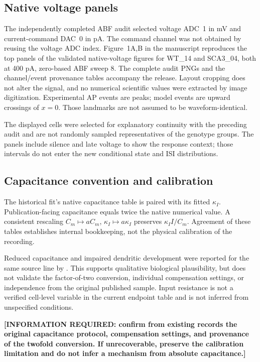 \documentclass[11pt,a4paper]{article}
\newcommand{\required}[1]{\textbf{[INFORMATION REQUIRED: #1]}}
\begin{document}
\subsection*{Native voltage panels}
The independently completed ABF audit selected voltage ADC~1 in mV and current-command DAC~0 in pA. The command channel was not obtained by reusing the voltage ADC index. Figure~1A,B in the manuscript reproduces the top panels of the validated native-voltage figures for WT\_14 and SCA3\_04, both at 400 pA, zero-based ABF sweep 8. The complete audit PNGs and the channel/event provenance tables accompany the release. Layout cropping does not alter the signal, and no numerical scientific values were extracted by image digitization. Experimental AP events are peaks; model events are upward crossings of $x=0$. Those landmarks are not assumed to be waveform-identical.

The displayed cells were selected for explanatory continuity with the preceding audit and are not randomly sampled representatives of the genotype groups. The panels include silence and late voltage to show the response context; those intervals do not enter the new conditional state and ISI distributions.

\subsection*{Capacitance convention and calibration}
The historical fit's native capacitance table is paired with its fitted $\kappa_I$. Publication-facing capacitance equals twice the native numerical value. A consistent rescaling $C_m\mapsto aC_m$, $\kappa_I\mapsto a\kappa_I$ preserves $\kappa_I I/C_m$. Agreement of these tables establishes internal bookkeeping, not the physical calibration of the recording.

Reduced capacitance and impaired dendritic development were reported for the same source line by \citet{konno2014}. This supports qualitative biological plausibility, but does not validate the factor-of-two conversion, individual compensation settings, or independence from the original published sample. Input resistance is not a verified cell-level variable in the current endpoint table and is not inferred from unspecified conditions.

\required{confirm from existing records the original capacitance protocol, compensation settings, and provenance of the twofold conversion. If unrecoverable, preserve the calibration limitation and do not infer a mechanism from absolute capacitance.}
\end{document}
